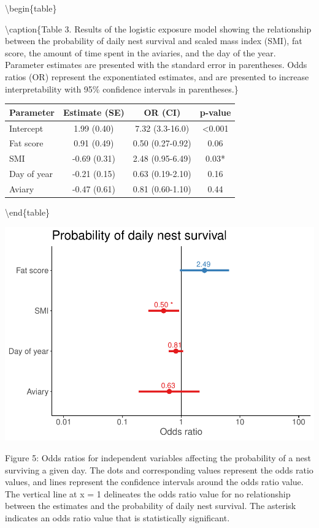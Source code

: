 \documentclass[
]{article}
\begin{document}
\textbackslash begin\{table\}

\textbackslash caption\{\label{tab:logexp}Table 3. Results of the
logistic exposure model showing the relationship between the probability
of daily nest survival and scaled mass index (SMI), fat score, the
amount of time spent in the aviaries, and the day of the year. Parameter
estimates are presented with the standard error in parentheses. Odds
ratios (OR) represent the exponentiated estimates, and are presented to
increase interpretability with 95\% confidence intervals in
parentheses.\} \centering

\begin{tabular}[t]{l|c|c|c}
\hline
Parameter & Estimate (SE) & OR (CI) & p-value\\
\hline
Intercept & 1.99 (0.40) & 7.32 (3.3-16.0) & <0.001\\
\hline
Fat score & 0.91 (0.49) & 0.50 (0.27-0.92) & 0.06\\
\hline
SMI & -0.69 (0.31) & 2.48 (0.95-6.49) & 0.03*\\
\hline
Day of year & -0.21 (0.15) & 0.63 (0.19-2.10) & 0.16\\
\hline
Aviary & -0.47 (0.61) & 0.81 (0.60-1.10) & 0.44\\
\hline
\end{tabular}

\textbackslash end\{table\}

\includegraphics{gcondition_files/figure-latex/logexp-1.pdf}

Figure 5: Odds ratios for independent variables affecting the
probability of a nest surviving a given day. The dots and corresponding
values represent the odds ratio values, and lines represent the
confidence intervals around the odds ratio value. The vertical line at x
= 1 delineates the odds ratio value for no relationship between the
estimates and the probability of daily nest survival. The asterisk
indicates an odds ratio value that is statistically significant.
\end{document}
